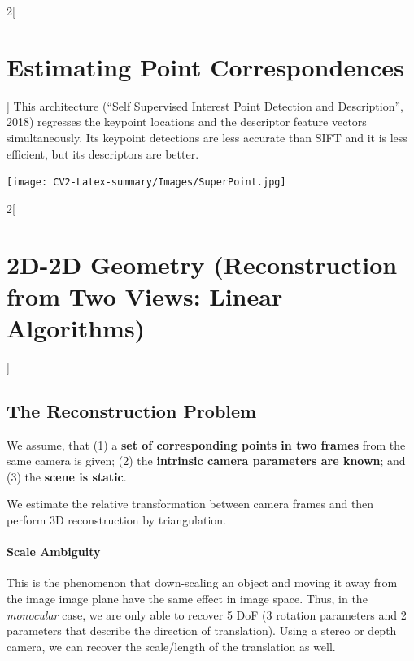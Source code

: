 \documentclass[oneside,fontsize=11pt,paper=a4]{scrartcl}
\begin{document}
\begin{multicols}{2}[\section{Estimating Point Correspondences}]
This architecture (``Self Supervised Interest Point Detection and Description'', 2018) regresses the keypoint locations and the descriptor feature vectors simultaneously. Its keypoint detections are less accurate than SIFT and it is less efficient, but its descriptors are better. 
\begin{center}
    \texttt{[image: CV2-Latex-summary/Images/SuperPoint.jpg]}
\end{center}

\end{multicols}

\newpage
\begin{multicols}{2}[\section{2D-2D Geometry (Reconstruction from Two Views: Linear Algorithms)}]

\subsection{The Reconstruction Problem}
We assume, that (1) a \textbf{set of corresponding points in two frames} from the same camera is given; (2) the \textbf{intrinsic camera parameters are known}; and (3) the \textbf{scene is static}.

We estimate the relative transformation between camera frames and then perform 3D reconstruction by triangulation.

\paragraph{Scale Ambiguity} This is the phenomenon that down-scaling an object and moving it away from the image image plane have the same effect in image space. Thus, in the \textit{monocular} case, we are only able to recover 5 DoF (3 rotation parameters and 2 parameters that describe the direction of translation). Using a stereo or depth camera, we can recover the scale/length of the translation as well.


\end{multicols}
\end{document}
